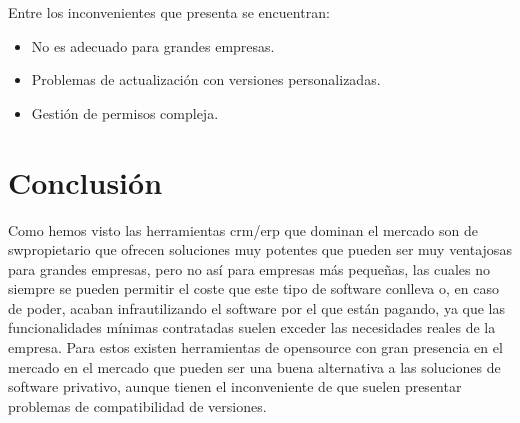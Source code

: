 Entre los inconvenientes que presenta se encuentran:
\begin{itemize}
\item No es adecuado para grandes empresas.
\item Problemas de actualización con versiones personalizadas.
\item Gestión de permisos compleja.
\end{itemize}


\section{Conclusión}
\label{sec:estado-arte-conclusion}
Como hemos visto las herramientas \acrshort{crm}/\acrshort{erp} que dominan el mercado son de \gls{swpropietario} que ofrecen soluciones muy potentes que pueden ser muy ventajosas para grandes empresas, pero no así para empresas más pequeñas, las cuales no siempre se pueden permitir el coste que este tipo de software conlleva o, en caso de poder, acaban infrautilizando el software por el que están pagando, ya que las funcionalidades mínimas contratadas suelen exceder las necesidades reales de la empresa. Para estos existen herramientas de \gls{opensource} con gran presencia en el mercado en el mercado que pueden ser una buena alternativa a las soluciones de software privativo, aunque tienen el inconveniente de que suelen presentar problemas de compatibilidad de versiones.
